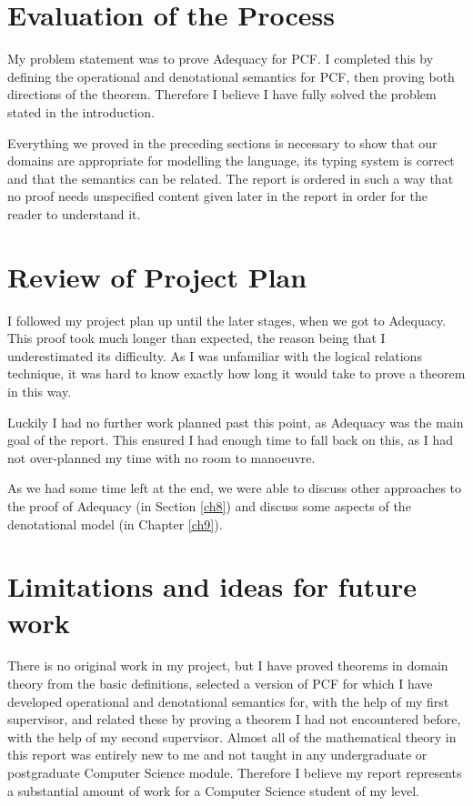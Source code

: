 \section{Evaluation of the Process} 
My problem statement was to prove Adequacy for PCF. I completed this by defining the operational and denotational semantics for PCF, then proving both directions of the theorem. Therefore I believe I have fully solved the problem stated in the introduction. 

Everything we proved in the preceding sections is necessary to show that our domains are appropriate for modelling the language, its typing system is correct and that the semantics can be related. The report is ordered in such a way that no proof needs unspecified content given later in the report in order for the reader to understand it. 

\section{Review of Project Plan}
I followed my project plan up until the later stages, when we got to Adequacy. This proof took much longer than expected, the reason being that I underestimated its difficulty. As I was unfamiliar with the logical relations technique, it was hard to know exactly how long it would take to  prove a theorem in this way.

 Luckily I had no further work planned past this point, as Adequacy was the main goal of the report. This ensured I had enough time to fall back on this, as I had not over-planned my time with no room to manoeuvre. 
 
As we had some time left at the end, we were able to discuss other approaches to the proof of Adequacy (in Section \ref{ch8}) and discuss some  aspects of the denotational model (in Chapter \ref{ch9}).

\section{Limitations and ideas for future work}
There is no original work in my project, but I have proved theorems in domain theory from the basic definitions, selected a version of PCF for which I have developed operational and denotational semantics for, with the help of my first supervisor, and related these by proving a theorem I had not encountered before, with the help of my second supervisor. Almost all of the mathematical theory in this report was entirely new to me and not taught in any undergraduate or postgraduate Computer Science module. Therefore I believe my report represents a substantial amount of work for a Computer Science student of my level.   


